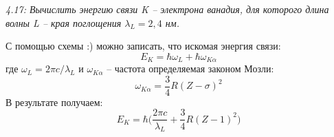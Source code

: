     \emph{4.17: Вычислить энергию связи K -- электрона ванадия, для
        которого длина волны L -- края поглощения 
        \( \lambda_L = 2,4 \) нм.}

        С помощью схемы :) можно записать, что искомая энергия связи: 
        \[ E_K = \hbar\omega_L + \hbar\omega_{K\alpha} \]
        где \( \omega_L = 2\pi c/\lambda_L \) и 
        \( \omega_{K\alpha} \) -- частота определяемая законом Мозли:
        \[ \omega_{K\alpha} = \frac{3}{4}R(Z-\sigma)^2 \]
        В результате получаем:
        \[ 
            E_K = \hbar
            \Big( 
                \frac{2\pi c}{\lambda_L} + \frac{3}{4}R(Z-1)^2
            \Big)
        \]
